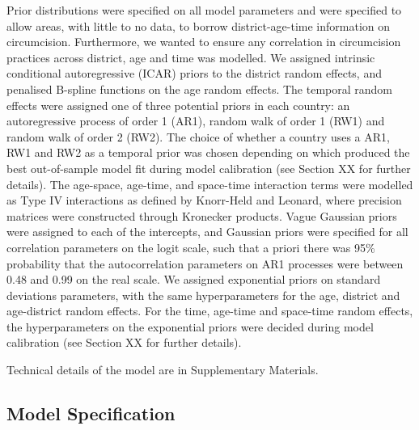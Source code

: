 \documentclass{article}
\begin{document}
Prior distributions were specified on all model parameters and were specified to allow areas, with little to no data, to borrow district-age-time information on circumcision. Furthermore, we wanted to ensure any correlation in circumcision practices across district, age and time was modelled. We assigned intrinsic conditional autoregressive (ICAR) priors to the district random effects, and penalised B-spline functions on the age random effects. The temporal random effects were assigned one of three potential priors in each country: an autoregressive process of order 1 (AR1), random walk of order 1 (RW1) and random walk of order 2 (RW2). The choice of whether a country uses a AR1, RW1 and RW2 as a temporal prior was chosen depending on which produced the best out-of-sample model fit during model calibration (see Section XX for further details). The age-space, age-time, and space-time interaction terms were modelled as Type IV interactions as defined by Knorr-Held and Leonard, where precision matrices were constructed through Kronecker products. Vague Gaussian priors were assigned to each of the intercepts, and Gaussian priors were specified for all correlation parameters on the logit scale, such that a priori there was 95\% probability that the autocorrelation parameters on AR1 processes were between 0.48 and 0.99 on the real scale. We assigned exponential priors on standard deviations parameters, with the same hyperparameters for the age, district and age-district random effects. For the time, age-time and space-time random effects, the hyperparameters on the exponential priors were decided during model calibration (see Section XX for further details). 

Technical details of the model are in Supplementary Materials.


\subsection{Model Specification}
\label{sec:orgaf7fa2a}


\end{document}
